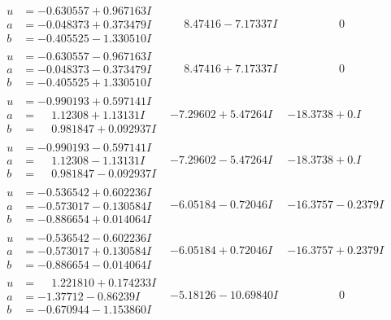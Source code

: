 \documentclass[1p]{elsarticle_modified}
\theoremstyle{definition}
\begin{document}
$$\begin{array}{c|c|c}
\begin{aligned}
u &= -0.630557 + 0.967163 I \\
a &= -0.048373 + 0.373479 I \\
b &= -0.405525 - 1.330510 I\end{aligned}
 & \phantom{-}8.47416 - 7.17337 I & \phantom{-0.000000 } 0 \\ \hline\begin{aligned}
u &= -0.630557 - 0.967163 I \\
a &= -0.048373 - 0.373479 I \\
b &= -0.405525 + 1.330510 I\end{aligned}
 & \phantom{-}8.47416 + 7.17337 I & \phantom{-0.000000 } 0 \\ \hline\begin{aligned}
u &= -0.990193 + 0.597141 I \\
a &= \phantom{-}1.12308 + 1.13131 I \\
b &= \phantom{-}0.981847 + 0.092937 I\end{aligned}
 & -7.29602 + 5.47264 I & -18.3738 + 0. I\phantom{ +0.000000I} \\ \hline\begin{aligned}
u &= -0.990193 - 0.597141 I \\
a &= \phantom{-}1.12308 - 1.13131 I \\
b &= \phantom{-}0.981847 - 0.092937 I\end{aligned}
 & -7.29602 - 5.47264 I & -18.3738 + 0. I\phantom{ +0.000000I} \\ \hline\begin{aligned}
u &= -0.536542 + 0.602236 I \\
a &= -0.573017 - 0.130584 I \\
b &= -0.886654 + 0.014064 I\end{aligned}
 & -6.05184 - 0.72046 I & -16.3757 - 0.2379 I \\ \hline\begin{aligned}
u &= -0.536542 - 0.602236 I \\
a &= -0.573017 + 0.130584 I \\
b &= -0.886654 - 0.014064 I\end{aligned}
 & -6.05184 + 0.72046 I & -16.3757 + 0.2379 I \\ \hline\begin{aligned}
u &= \phantom{-}1.221810 + 0.174233 I \\
a &= -1.37712 - 0.86239 I \\
b &= -0.670944 - 1.153860 I\end{aligned}
 & -5.18126 - 10.69840 I & \phantom{-0.000000 } 0 \\ \hline\begin{aligned}

\end{aligned}
\end{array}$$
\end{document}
